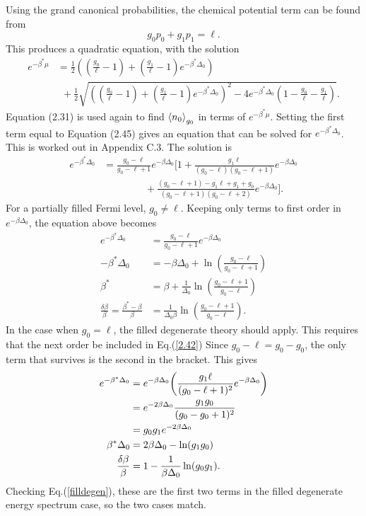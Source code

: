 Using the grand canonical probabilities, the chemical potential term can be found from
\begin{equation}
    g_0 p_0+g_1 p_1=\ell. \label{2.40}
\end{equation}
This produces a quadratic equation, with the solution
\begin{align}
    e^{-\beta^*\mu }&=\frac{1}{2}((\frac{g_0}{\ell}-1)+(\frac{g_1}{\ell}-1)e^{-\beta^*\Delta_0})\nonumber\\
    &\ \ +\frac{1}{2}\sqrt{((\frac{g_0}{\ell}-1)+(\frac{g_1}{\ell}-1)e^{-\beta^*\Delta_0})^2-4e^{-\beta^*\Delta_0}(1-\frac{g_0}{\ell}-\frac{g_1}{\ell})} .
\end{align}
Equation (2.31) is used again to find $\left<{n_0}\right>_{g_0}$ in terms of $e^{-\beta^*\mu}$.
Setting the first term equal to Equation (2.45) gives an equation that can be solved for $e^{-\beta^*\Delta_0}$. This is worked out in Appendix C.3. The solution is
\begin{align}
    e^{-\beta^*\Delta_0}&=\frac{g_0-\ell}{g_0-\ell+1}e^{-\beta\Delta_0} \Biggr[1+\frac{g_1 \ell}{(g_0-\ell)(g_0-\ell+1)}e^{-\beta\Delta_0}\nonumber\\
    &\ \ \ \ \ \ \ \ \ \ \ \ \ \ \ \ \ \ \ +\frac{(g_0-\ell+1)-g_1\ell+g_1+g_0}{(g_0-\ell+1)(g_0-\ell+2)}e^{-\beta\Delta_0}\Biggr]. \label{2.42}
\end{align}
For a partially filled Fermi level, $g_0\neq \ell$. Keeping only terms to first order in $e^{-\beta\Delta_0}$, the equation above becomes
\begin{align}
    e^{-\beta^*\Delta_0}&=\frac{g_0-\ell}{g_0-\ell+1} e^{-\beta\Delta_0}\nonumber\\
    -\beta^*\Delta_0&=-\beta\Delta_0+\ln(\frac{g_0-\ell}{g_0-\ell+1})\nonumber\\
    \beta^*&=\beta+\frac{1}{\Delta_0}\ln(\frac{g_0-\ell+1}{g_0-\ell})\nonumber\\
    \frac{\delta\beta}{\beta}=\frac{\beta^*-\beta}{\beta}&=\frac{1}{\Delta_0 \beta}\ln(\frac{g_0-\ell+1}{g_0-\ell}). \label{partfilldegen1}
\end{align}
In the case when $g_0=\ell$, the filled degenerate theory should apply. This requires that the next order be included in Eq.\@ (\ref{2.42}) Since $g_0-\ell=g_0-g_0$, the only term that survives is the second in the bracket. This gives
\begin{align}
    e^{-\beta^*\Delta_0}&= e^{-\beta\Delta_0} \qty(\frac{g_1 \ell}{(g_0-\ell+1)^2} e^{-\beta\Delta_0})\nonumber\\
    &=e^{-2\beta\Delta_0} \frac{g_1 g_0}{(g_0-g_0+1)^2}\nonumber\\
    &=g_0g_1e^{-2\beta\Delta_0}\nonumber\\
    \beta^*\Delta_0&=2\beta\Delta_0 - \ln(g_1g_0)\nonumber\\
    \frac{\delta\beta}{\beta}&=1-\frac{1}{\beta\Delta_0} \ln(g_0g_1). \label{partfilldegen}
\end{align}
Checking Eq.\@ (\ref{filldegen}), these are the first two terms in the filled degenerate energy spectrum case, so the two cases match. 
